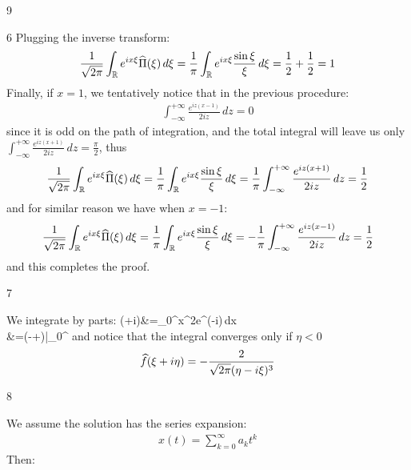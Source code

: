 \begin{vv286}{9}
\begin{vv286_mp}{6}
       Plugging the inverse transform: 
       \begin{align*}
	 \frac{1}{\sqrt{2\pi}}\int_{\mathbb{R}}e^{ix\xi}\widehat{\Pi}({\xi})\,
	 d\xi=\frac{1}{\pi}\int_{\mathbb{R}}e^{ix\xi}\frac{\sin \xi}{\xi}\, d\xi
	 =\frac{1}{2}+\frac{1}{2}=1
       \end{align*}
       Finally, if $x=1$, we tentatively notice that in the
       previous procedure:
       \begin{align*}
	 \int_{-\infty}^{+\infty}\frac{e^{iz(x-1)}}{2iz}\,dz=0
       \end{align*}
       since it is odd on the path of integration,
       and the total integral will leave us only $ \int_{-\infty}^{+\infty}\frac{e^{iz(x+1)}}{2iz}\,dz=\frac{\pi}{2}$, thus
 \begin{align*}
	 \frac{1}{\sqrt{2\pi}}\int_{\mathbb{R}}e^{ix\xi}\widehat{\Pi}({\xi})\,
	 d\xi=\frac{1}{\pi}\int_{\mathbb{R}}e^{ix\xi}\frac{\sin \xi}{\xi}\, d\xi
	 =\frac{1}{\pi}
	 \int_{-\infty}^{+\infty}\frac{e^{iz(x+1)}}{2iz}\,dz=\frac{1}{2}
       \end{align*}
and for similar reason we have when $x=-1$:
 \begin{align*}
	 \frac{1}{\sqrt{2\pi}}\int_{\mathbb{R}}e^{ix\xi}\widehat{\Pi}({\xi})\,
	 d\xi=\frac{1}{\pi}\int_{\mathbb{R}}e^{ix\xi}\frac{\sin \xi}{\xi}\, d\xi
	 =-\frac{1}{\pi}
	 \int_{-\infty}^{+\infty}\frac{e^{iz(x-1)}}{2iz}\,dz=\frac{1}{2}
       \end{align*}
       and this completes the proof.
  \end{vv286_mp}
   \begin{vv286_ms}{7}
       \item[]
	 We integrate by parts:
	 \eq
	 {
	 (\xi+i\eta)&=\int_0^{\infty}x^2e^{(\eta-i\xi)}\,dx\\
	 &=\left(-+\right)\Big|_{0}^{\infty}\quad{}
	 }
	 and notice that the integral
	 converges only if $\eta<0$
	 \begin{align*}
	   \widehat{f}(\xi+i\eta)=-\frac{2}{\sqrt{2\pi}(\eta-i\xi)^3}
	 \end{align*}
       \end{vv286_ms}
       \begin{vv286_ms}{8}
    \item[(i)]
      We assume the solution has the series expansion:
      \begin{align*}
	x(t)=\sum_{k=0}^{\infty}a_kt^k
      \end{align*}
      Then:
      \begin{align*}

\end{align*}
\end{vv286_ms}
\end{vv286}
